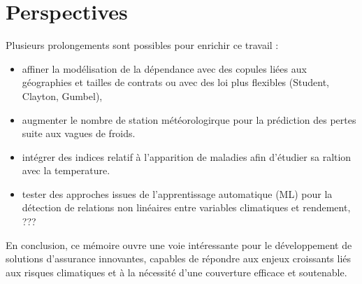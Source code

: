 \documentclass[11pt,a4paper,openright,twoside]{report}
\begin{document}
\section*{Perspectives}
Plusieurs prolongements sont possibles pour enrichir ce travail :
\begin{itemize}
    \item affiner la modélisation de la dépendance avec des copules liées aux géographies et tailles de contrats ou avec des loi plus flexibles (Student, Clayton, Gumbel),
    \item  augmenter le nombre de station météorologirque pour la prédiction des pertes suite aux vagues de froids.
    \item intégrer des indices relatif à l'apparition de maladies afin d'étudier sa raltion avec la temperature.
    \item tester des approches issues de l’apprentissage automatique (ML) pour la détection de relations non linéaires entre variables climatiques et rendement, ???
\end{itemize}

En conclusion, ce mémoire ouvre une voie intéressante pour le développement de solutions d’assurance innovantes, capables de répondre aux enjeux croissants liés aux risques climatiques et à la nécessité d’une couverture efficace et soutenable.

\clearpage
{}


\end{document}
